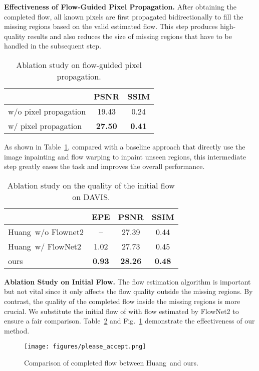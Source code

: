 \documentclass[10pt,twocolumn,letterpaper]{article}
\begin{document}
\noindent
\textbf{Effectiveness of Flow-Guided Pixel Propagation.}
After obtaining the completed flow, all known pixels are first propagated bidirectionally to fill the missing regions based on the valid estimated flow.
This step produces high-quality results and also reduces the size of missing regions that have to be handled in the subsequent step.
\begin{table}[t]
\small
\caption{Ablation study on flow-guided pixel propagation.}
\vspace{-8pt}
\centering
\begin{tabular}{l|c|c}
              & PSNR             & SSIM            \\ \hline \hline
w/o pixel propagation & 19.43          & 0.24          \\ \hline
w/ pixel propagation & \textbf{27.50} & \textbf{0.41}
\end{tabular}
\label{tab:propagation}
\vspace{-10pt}
\end{table}

As shown in Table~\ref{tab:propagation}, compared with a baseline approach that directly use the image inpainting and flow warping to inpaint unseen regions, this intermediate step greatly eases the task and improves the overall performance.

\begin{table}[t]
	\small
	\caption{Ablation study on the quality of the initial flow on DAVIS.}
	\vspace{-10pt}
	\centering
	\begin{tabular}{l|c|c|c}
		
		&EPE     & PSNR    & SSIM   \\ \hline \hline
		Huang~\etal w/o Flownet2 & --  & 27.39 & 0.44 \\ \hline
		Huang~\etal w/ FlowNet2 & 1.02 & 27.73 & 0.45 \\ \hline
		ours           &  \bf{0.93}  & \bf{28.26}  & \bf{0.48}
	\end{tabular}
	\label{tab:initialflow}
	\vspace{-5pt}
\end{table}

\noindent
\textbf{Ablation Study on Initial Flow.}
The flow estimation algorithm is important but not vital since it only affects the flow quality outside the missing regions.
By contrast, the quality of the completed flow inside the missing regions is more crucial.
We substitute the initial flow of \cite{Huang-SigAsia-2016} with flow estimated by FlowNet2 to ensure a fair comparison.
Table~\ref{tab:initialflow} and Fig.~\ref{fig:initialflow} demonstrate the effectiveness of our method.
\begin{figure}[t]
	\centering
	\texttt{[image: figures/please\_accept.png]}
	\vspace{-15pt}
	\caption{\small{Comparison of completed flow between Huang~\etal and ours.}}
	\label{fig:initialflow}
	\vspace{-13pt}
\end{figure}
\end{document}
